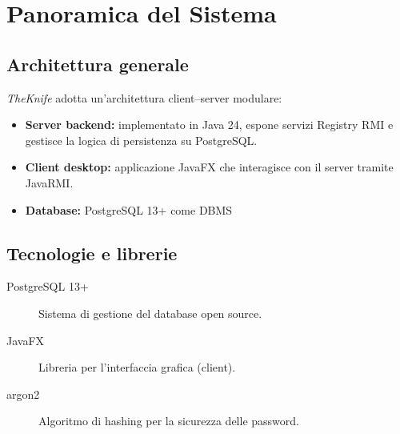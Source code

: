 \section{Panoramica del Sistema}
\label{cap:panoramica}
\subsection{Architettura generale}
\emph{TheKnife} adotta un'architettura client–server modulare:
\begin{itemize}
    \item \textbf{Server backend:} implementato in Java 24, espone servizi Registry RMI e gestisce la logica di persistenza su PostgreSQL.
    \item \textbf{Client desktop:} applicazione JavaFX che interagisce con il server tramite JavaRMI.
    \item \textbf{Database:} PostgreSQL 13+ come DBMS
\end{itemize}

\subsection{Tecnologie e librerie}
\begin{description}
    \item[PostgreSQL 13+] Sistema di gestione del database open source.
    \item[JavaFX] Libreria per l'interfaccia grafica (client).
    \item[argon2] Algoritmo di hashing per la sicurezza delle password.
\end{description}
